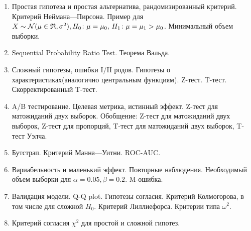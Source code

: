 \begin{enumerate}
	\item Простая гипотеза и простая альтернатива, рандомизированный критерий. Критерий Неймана—Пирсона. Пример для $X \sim \mathcal N(\mu \in \mathfrak{R}, \sigma^2), H_0 \colon \mu = \mu_0, \, H_1 \colon \mu = \mu_1 > \mu_0$. Минимальный объем выборки.
	\item Sequential Probability Ratio Test. Теорема Вальда.
	\item Сложный гипотезы, ошибки I/II родов. Гипотезы о характеристиках(аналогично центральным функциям). Z-тест. T-тест. Скорректированный T-тест.

	\item A/B тестирование. Целевая метрика, истинный эффект.  Z-тест для матожиданий двух выборок. Обобщение: Z-тест для матожиданий двух выборок, Z-тест для пропорций, T-тест для матожиданий двух выборок, T-тест Уэлча.
	\item Бутстрап. Критерий Манна—Уитни. ROC-AUC.
	\item Вариабельность и маленький эффект. Повторные наблюдения. Необходимый объем выборки для $\alpha = 0.05, \beta = 0.2$. M-ошибка.

	\item Валидация модели. Q-Q plot. Гипотезы согласия. Критерий Колмогорова, в том числе для сложной $H_0$. Критерий Лиллиефорса. Критерии типа $\omega^2$.
	\item Критерий согласия $\chi^2$ для простой и сложной гипотез.

	
	
\end{enumerate}
